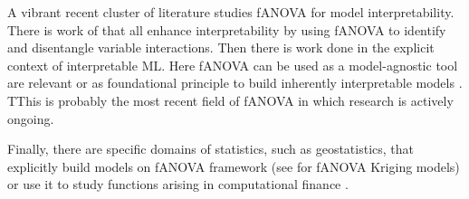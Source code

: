 A vibrant recent cluster of literature studies fANOVA for model interpretability. There is work of \cite{lengerich2020, konig2024, choi2025} that all enhance interpretability by using fANOVA to identify and disentangle variable interactions.
Then there is work done in the explicit context of interpretable ML. Here fANOVA can be used as a model-agnostic tool \cite{hooker2004,fumagalli2025} are relevant or as foundational principle to build inherently interpretable models \cite{hu2025}. TThis is probably the most recent field of fANOVA in which research is actively ongoing.\par

Finally, there are specific domains of statistics, such as geostatistics, that explicitly build models on fANOVA framework (see \cite{muehlenstaedt2012} for fANOVA Kriging models) or use it to study functions arising in computational finance \cite{liu2006}.\par







